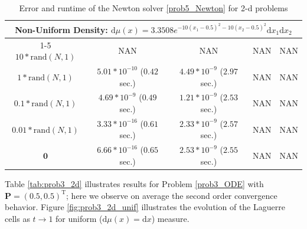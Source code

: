 \documentclass{scrartcl}
\newcommand{\dd}{\mathrm d}
\theoremstyle{plain}
\theoremstyle{definition}
\begin{document}
\begin{table}[ht]
{\begin{tabular}{||c||c|c|c|c||}
        \multicolumn{5}{c}{\Large \textbf{Non-Uniform Density:} $\dd\mu(x) = 3.3508e^{-10(x_1-0.5)^2-10(x_2-0.5)^2}\dd x_1\dd x_2$}\vspace{0.25em} \\ \cline{1-5}\cline{1-5}
        $10*\text{rand}(N,1)$  &                           NAN &                          NAN & NAN & NAN \\\hline
        $1*\text{rand}(N,1)$   & $5.01*10^{-10}$ ($0.42$ sec.) & $4.49*10^{-9}$ ($2.97$ sec.) & NAN & NAN \\\hline
        $0.1*\text{rand}(N,1)$ & $4.69*10^{- 9}$ ($0.49$ sec.) & $1.21*10^{-9}$ ($2.53$ sec.) & NAN & NAN \\\hline
        $0.01*\text{rand}(N,1)$& $3.33*10^{-16}$ ($0.61$ sec.) & $2.33*10^{-9}$ ($2.57$ sec.) & NAN & NAN \\\hline
        $\mathbf{0}$           & $6.66*10^{-16}$ ($0.65$ sec.) & $2.53*10^{-9}$ ($2.55$ sec.) & NAN & NAN \\\hline
        \hline
    \end{tabular}}
    \caption{Error and runtime of the Newton solver \eqref{prob5_Newton} for  2-d problems} \label{tab:prob5_2d}
\end{table}

Table \ref{tab:prob3_2d} illustrates results for Problem \eqref{prob3_ODE} with \(\mathbf{P}=(0.5,0.5)^{\operatorname{T}}\); here we observe on average the second order convergence behavior. Figure \ref{fig:prob3_2d_unif} illustrates the evolution of the Laguerre cells as \(t\to1\) for uniform ($\dd\mu(x) = \dd x$) measure.
\end{document}
